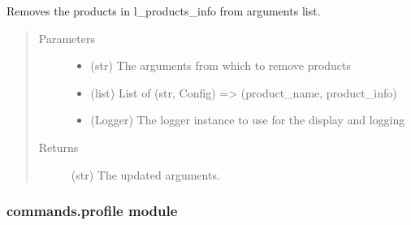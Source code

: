 \documentclass[a4paper,10pt,english]{sphinxmanual}
\begin{document}
\begin{fulllineitems}
\label{\detokenize{apidoc_commands/commands:commands.prepare.remove_products}}
Removes the products in l\_products\_info from arguments list.
\begin{quote}\begin{description}
\item[{Parameters}] \leavevmode\begin{itemize}
\item {} 
 \textendash{} (str) The arguments from which to remove products

\item {} 
 \textendash{} (list) 
List of (str, Config) =\textgreater{} (product\_name, product\_info)

\item {} 
 \textendash{} (Logger) 
The logger instance to use for the display and logging

\end{itemize}

\item[{Returns}] \leavevmode
(str) The updated arguments.

\end{description}\end{quote}

\end{fulllineitems}



\subsubsection{commands.profile module}
\label{\detokenize{apidoc_commands/commands:commands-profile-module}}\label{\detokenize{apidoc_commands/commands:module-commands.profile}}
\end{document}
